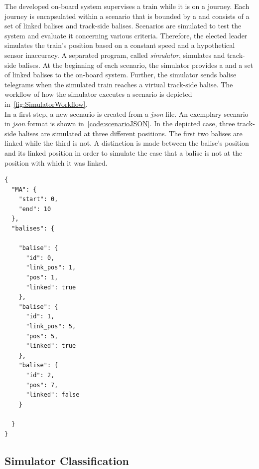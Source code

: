 The developed on-board system supervises a train while it is on a journey.
Each journey is encapsulated within a scenario that is bounded by a  and consists of a set of linked balises and track-side balises.
Scenarios are simulated to test the system and evaluate it concerning various criteria.
Therefore, the elected leader simulates the train's position based on a constant speed and a hypothetical sensor inaccuracy.
A separated program, called \textit{simulator}, simulates  and track-side balises.
At the beginning of each scenario, the simulator provides a  and a set of linked balises to the on-board system.
Further, the simulator sends balise telegrams when the simulated train reaches a virtual track-side balise.
The workflow of how the simulator executes a scenario is depicted in~\autoref{fig:SimulatorWorkflow}.
\\

In a first step, a new scenario is created from a \textit{json} file.
An exemplary scenario in \textit{json} format is shown in~\autoref{code:scenarioJSON}.
In the depicted case, three track-side balises are simulated at three different positions.
The first two balises are linked while the third is not.
A distinction is made between the balise's position and its linked position in order to simulate the case that a balise is not at the position with which it was linked.

\begin{minipage}{\linewidth}
\begin{lstlisting}[caption={The used simulator simulates scenarios that are provided in \texttt{JSON} format. Each scenario consists of a \abr{MA} with a start and an end position, as well as a set of balises. Balises can either be linked or not and include an identification number, a linking position, and a position. The linking position is used to simulate a misplaced balise.}, label=code:scenarioJSON]
{
  "MA": {
    "start": 0,
    "end": 10
  },
  "balises": {

    "balise": {
      "id": 0,
      "link_pos": 1,
      "pos": 1,
      "linked": true
    },
    "balise": {
      "id": 1,
      "link_pos": 5,
      "pos": 5,
      "linked": true
    },
    "balise": {
      "id": 2,
      "pos": 7,
      "linked": false
    }

  }
}

\end{lstlisting}
\end{minipage}

\subsection{Simulator Classification}


